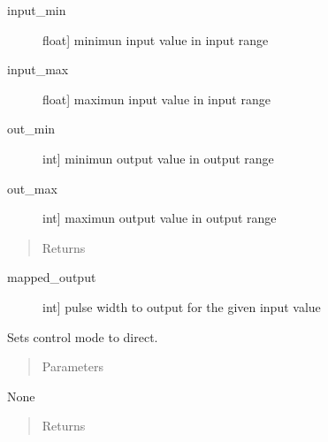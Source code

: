 \documentclass[letterpaper,10pt,english]{sphinxmanual}
\begin{document}
\begin{fulllineitems}
\begin{fulllineitems}
\begin{description}
\item[{input\_min}] \leavevmode{[}float{]}
\sphinxAtStartPar
minimun input value in input range

\item[{input\_max}] \leavevmode{[}float{]}
\sphinxAtStartPar
maximun input value in input range

\item[{out\_min}] \leavevmode{[}int{]}
\sphinxAtStartPar
minimun output value in output range

\item[{out\_max}] \leavevmode{[}int{]}
\sphinxAtStartPar
maximun output value in output range

\end{description}
\begin{quote}\begin{description}
\item[{Returns}] \leavevmode
\end{description}\end{quote}
\begin{description}
\item[{mapped\_output}] \leavevmode{[}int{]}
\sphinxAtStartPar
pulse width to output for the given input value

\end{description}

\end{fulllineitems}


\begin{fulllineitems}
\label{\detokenize{specific:NeckTiltOutput.NeckTiltOutput.set_control_direct}}
\sphinxAtStartPar
Sets control mode to direct.
\begin{quote}\begin{description}
\item[{Parameters}] \leavevmode
\end{description}\end{quote}

\sphinxAtStartPar
None
\begin{quote}\begin{description}
\item[{Returns}] \leavevmode
\end{description}\end{quote}


\end{fulllineitems}
\end{fulllineitems}
\end{document}
